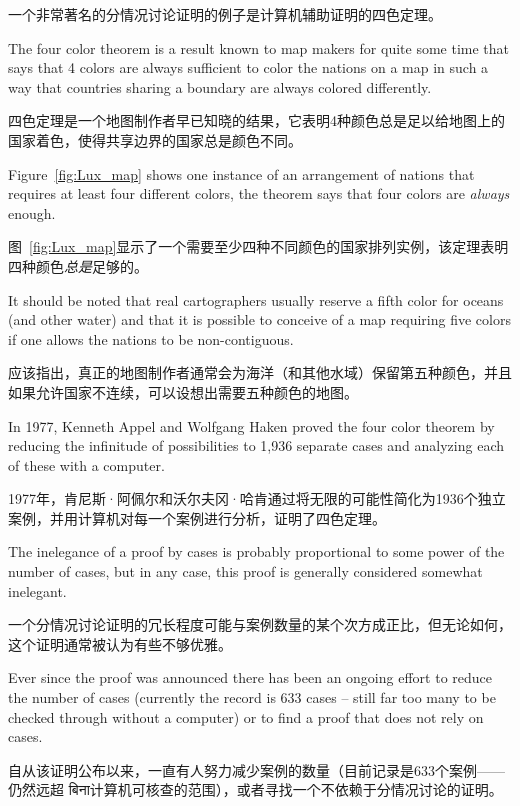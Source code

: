 一个非常著名的分情况讨论证明的例子是计算机辅助证明的四色定理。

The four color theorem is a result known to
map makers for quite some time that says that 4 colors are always sufficient
to color the nations on a map in such a way that countries sharing a boundary
are always colored differently.

四色定理是一个地图制作者早已知晓的结果，它表明4种颜色总是足以给地图上的国家着色，使得共享边界的国家总是颜色不同。

Figure~\ref{fig:Lux_map} shows one instance
of an arrangement of nations that requires at least four different colors,
the theorem says that four colors are \emph{always} enough.

图~\ref{fig:Lux_map}显示了一个需要至少四种不同颜色的国家排列实例，该定理表明四种颜色\emph{总是}足够的。

It should be noted
that real cartographers usually reserve a fifth color for oceans (and other
water) and that it is possible to conceive of a map requiring five colors if
one allows the nations to be non-contiguous.

应该指出，真正的地图制作者通常会为海洋（和其他水域）保留第五种颜色，并且如果允许国家不连续，可以设想出需要五种颜色的地图。

In 1977,
 Kenneth Appel and
Wolfgang Haken proved the four color
theorem by reducing the infinitude of possibilities to
1,936 separate cases and analyzing each of these with a computer.

1977年，肯尼斯·阿佩尔和沃尔夫冈·哈肯通过将无限的可能性简化为1936个独立案例，并用计算机对每一个案例进行分析，证明了四色定理。

The inelegance of a proof by cases is probably proportional to some power of
the number of cases, but in any case, this proof is generally considered
somewhat inelegant.

一个分情况讨论证明的冗长程度可能与案例数量的某个次方成正比，但无论如何，这个证明通常被认为有些不够优雅。

Ever since the proof was announced there has been an
ongoing effort to reduce the number of cases (currently the record is 633
cases -- still far too many to be checked through without a computer) or to
find a proof that does not rely on cases.

自从该证明公布以来，一直有人努力减少案例的数量（目前记录是633个案例——仍然远超 बिना计算机可核查的范围），或者寻找一个不依赖于分情况讨论的证明。

